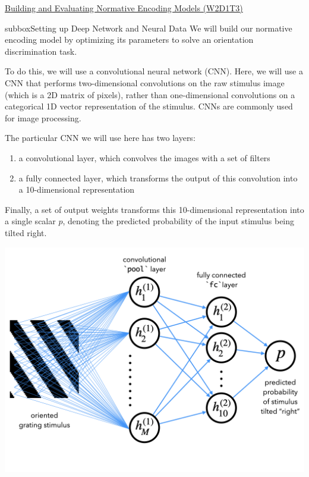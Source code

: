 \begin{textbox}{\href{https://compneuro.neuromatch.io/tutorials/W2D1_DeepLearning/student/W2D1_Tutorial3.html}{Building and Evaluating Normative Encoding Models (W2D1T3)} }
\begin{subbox}{subbox}{Setting up Deep Network and Neural Data}
\scriptsize
We will build our normative encoding model by optimizing its parameters to solve an orientation discrimination task. 

To do this, we will use a convolutional neural network (CNN). Here, we will use a CNN that performs two-dimensional convolutions on the raw stimulus image (which is a 2D matrix of pixels), rather than one-dimensional convolutions on a categorical 1D vector representation of the stimulus. CNNs are commonly used for image processing. 

The particular CNN we will use here has two layers:
\begin{enumerate}
    \item 
a convolutional layer, which convolves the images with a set of filters
    \item a fully connected layer, which transforms the output of this convolution into a 10-dimensional representation
\end{enumerate}

Finally, a set of output weights transforms this 10-dimensional representation into a single scalar $p$, denoting the predicted probability of the input stimulus being tilted right. 

\centering
\includegraphics[scale=0.18]{Figures/DL/DLFigure4.png}

\end{subbox}
\end{textbox}
